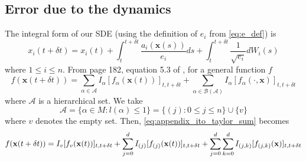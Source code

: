\subsection{Error due to the dynamics}

The integral form of our SDE (using the definition of $e_i$ from \eqref{eq:e_def}) is
\begin{equation}
x_{i}(t + \delta t) = x_{i}(t) + \int_{t}^{t + \delta t} \frac{a_i(\mathbf{x}(s))}{e_i} ds + \int_{t}^{t+\delta t} \frac{1}{\sqrt{e_i}} dW_i(s)
\end{equation}
where $1 \le i \le n$.
%
From page 182, equation 5.3 of \cite{kloeden1992numerical}, for a general function $f$
%
\begin{equation} \label{eq:appendix_ito_taylor_sum}
f(\mathbf{x}(t+\delta t)) = \sum_{\alpha \in \mathcal{A}} I_\alpha[f_\alpha (\mathbf{x}(t))]_{t, t+\delta t} + \sum_{\alpha \in \mathcal{B}(\mathcal{A})} I_\alpha [f_\alpha(\cdot, \mathbf{x})]_{t, t+\delta t}
\end{equation}
where $\mathcal{A}$ is a hierarchical set.
%
We take
\begin{equation}
 \mathcal{A} = \{ \alpha \in M : l(\alpha) \le 1 \} = \{ (j) : 0 \le j \le n \} \cup \{v \}
\end{equation}
%
where $v$ denotes the empty set.
%
Then, \eqref{eq:appendix_ito_taylor_sum} becomes
\begin{equation} \label{eq:general_ito_taylor_sum}
f(\mathbf{x}(t+\delta t)) = I_{v} [f_v(\mathbf{x}(t))]_{t, t+\delta t} + \sum_{j=0}^d I_{(j)} [f_{(j)}(\mathbf{x}(t))]_{t, t+\delta t} + \sum_{j=0}^d \sum_{k=0}^d I_{(j,k)} [f_{(j,k)} ( \mathbf{x} )]_{t, t+\delta t}
\end{equation}

